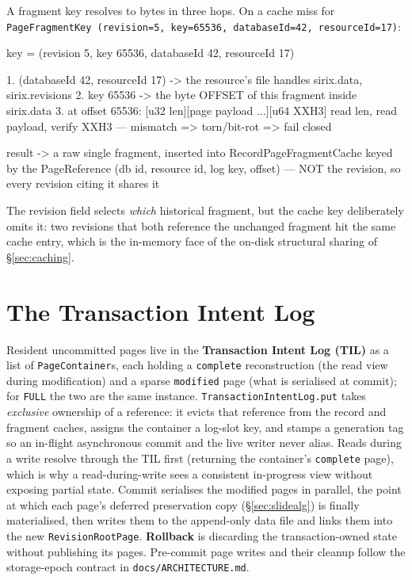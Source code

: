 \documentclass[11pt,a4paper,oneside]{report}
\newcommand{\dcap}[1]{\par\vspace{1pt}\noindent{\small\sffamily\bfseries\color{slate}#1}\par\vspace{-2pt}}
\theoremstyle{sirixthm}
\newcommand{\code}[1]{\texttt{#1}}
\begin{document}
A fragment key resolves to bytes in three hops. On a cache miss for
\code{PageFragmentKey (revision=5, key=65536, databaseId=42, resourceId=17)}:

\dcap{Resolving one PageFragmentKey to a page on disk}
\begin{diagramS}
key = (revision 5, key 65536, databaseId 42, resourceId 17)

  1. (databaseId 42, resourceId 17)  -> the resource's file handles { sirix.data, sirix.revisions }
  2. key 65536                       -> the byte OFFSET of this fragment inside sirix.data
  3. at offset 65536:  [u32 len][page payload ...][u64 XXH3]
                       read len, read payload, verify XXH3 — mismatch => torn/bit-rot => fail closed

  result -> a raw single fragment, inserted into RecordPageFragmentCache keyed by the PageReference
            (db id, resource id, log key, offset) — NOT the revision, so every revision citing it shares it
\end{diagramS}

\noindent The revision field selects \emph{which} historical fragment, but the cache key deliberately
omits it: two revisions that both reference the unchanged fragment hit the same cache entry, which is the
in-memory face of the on-disk structural sharing of \S\ref{sec:caching}.

\section{The Transaction Intent Log}

Resident uncommitted pages live in the \textbf{Transaction Intent Log (TIL)} as a list of
\code{PageContainer}s, each holding a \code{complete} reconstruction (the read view during
modification) and a sparse \code{modified} page (what is serialised at commit); for
\code{FULL} the two are the same instance. \code{TransactionIntentLog.put} takes \emph{exclusive}
ownership of a reference: it evicts that reference from the record and fragment caches, assigns the
container a log-slot key, and stamps a generation tag so an in-flight asynchronous commit and the
live writer never alias. Reads during a write resolve through the TIL first (returning the
container's \code{complete} page), which is why a read-during-write sees a consistent in-progress
view without exposing partial state. Commit serialises the modified pages in parallel, the point
at which each page's deferred preservation copy (\S\ref{sec:slidealg}) is finally materialised, then writes them to
the append-only data file and links them into the new \code{RevisionRootPage}. \textbf{Rollback} is
discarding the transaction-owned state without publishing its pages. Pre-commit page writes
and their cleanup follow the storage-epoch contract in \code{docs/ARCHITECTURE.md}.
\end{document}
